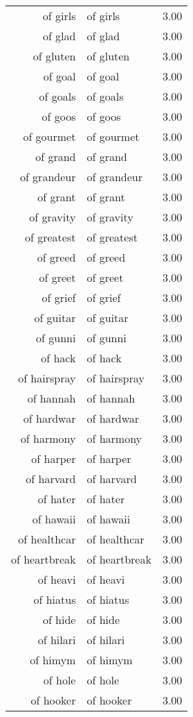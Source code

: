 \begin{table}[ht]
\begin{tabular}{rlr}
  of girls & of girls & 3.00 \\ 
  of glad & of glad & 3.00 \\ 
  of gluten & of gluten & 3.00 \\ 
  of goal & of goal & 3.00 \\ 
  of goals & of goals & 3.00 \\ 
  of goos & of goos & 3.00 \\ 
  of gourmet & of gourmet & 3.00 \\ 
  of grand & of grand & 3.00 \\ 
  of grandeur & of grandeur & 3.00 \\ 
  of grant & of grant & 3.00 \\ 
  of gravity & of gravity & 3.00 \\ 
  of greatest & of greatest & 3.00 \\ 
  of greed & of greed & 3.00 \\ 
  of greet & of greet & 3.00 \\ 
  of grief & of grief & 3.00 \\ 
  of guitar & of guitar & 3.00 \\ 
  of gunni & of gunni & 3.00 \\ 
  of hack & of hack & 3.00 \\ 
  of hairspray & of hairspray & 3.00 \\ 
  of hannah & of hannah & 3.00 \\ 
  of hardwar & of hardwar & 3.00 \\ 
  of harmony & of harmony & 3.00 \\ 
  of harper & of harper & 3.00 \\ 
  of harvard & of harvard & 3.00 \\ 
  of hater & of hater & 3.00 \\ 
  of hawaii & of hawaii & 3.00 \\ 
  of healthcar & of healthcar & 3.00 \\ 
  of heartbreak & of heartbreak & 3.00 \\ 
  of heavi & of heavi & 3.00 \\ 
  of hiatus & of hiatus & 3.00 \\ 
  of hide & of hide & 3.00 \\ 
  of hilari & of hilari & 3.00 \\ 
  of himym & of himym & 3.00 \\ 
  of hole & of hole & 3.00 \\ 
  of hooker & of hooker & 3.00 \\ 

\end{tabular}
\end{table}
